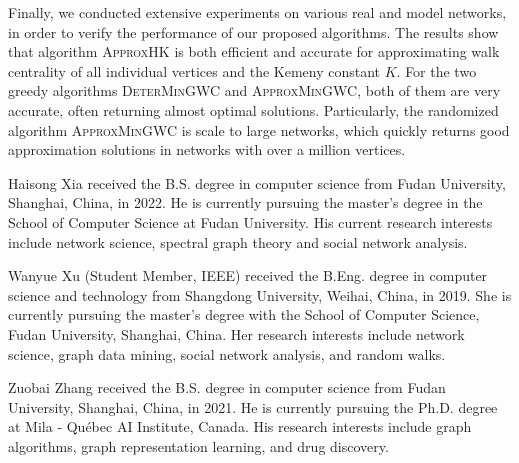 \documentclass[10pt,twocolumn,twoside]{IEEEtran}
\newcommand{\biophoto}[1]{\texttt{[image: \#1]}}
\begin{document}
Finally, we conducted extensive experiments on various real and model networks, in order to verify the performance of our proposed algorithms. The results show that algorithm \textsc{ApproxHK} is both efficient and accurate for approximating walk centrality of all individual vertices and the Kemeny constant $K$. For the two greedy algorithms \textsc{DeterMinGWC} and \textsc{ApproxMinGWC}, both of them are very accurate, often returning almost optimal solutions. Particularly, the randomized algorithm \textsc{ApproxMinGWC} is scale to large networks, which quickly returns good approximation solutions in networks with over a million vertices.





\balance

\begin{IEEEbiographynophoto}{Haisong Xia}
    received the B.S. degree in computer science from Fudan University, Shanghai, China, in 2022. He is currently pursuing the master's degree in the School of Computer Science at Fudan University.
    His current research interests include network science, spectral graph theory and social network analysis.
\end{IEEEbiographynophoto}

\begin{IEEEbiographynophoto}{Wanyue Xu}
    (Student Member, IEEE) received the B.Eng. degree in computer science and technology from Shangdong University, Weihai, China, in 2019. She is currently pursuing the master's degree with the School of Computer Science, Fudan University, Shanghai, China.
    Her research interests include network science, graph data mining, social network analysis, and random walks.
\end{IEEEbiographynophoto}

\begin{IEEEbiographynophoto}{Zuobai Zhang}
    received the B.S. degree  in computer science from Fudan University, Shanghai, China, in 2021. 	He is currently pursuing the Ph.D. degree at Mila - Qu\'{e}bec AI Institute, Canada. His research interests include graph algorithms, graph representation learning, and drug discovery.
\end{IEEEbiographynophoto}

\end{document}
